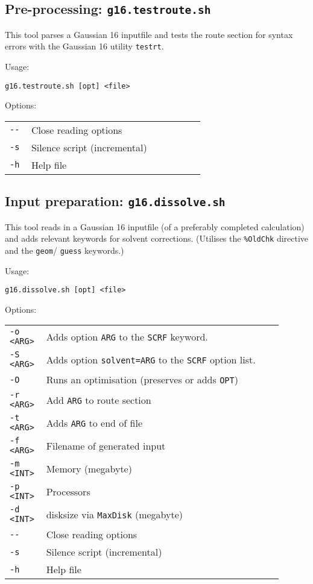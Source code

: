 \documentclass[   %
  final,          %
  a4paper         %
]{article}
\begin{document}
\subsection{Pre-processing: \texorpdfstring{{\lstinline`g16.testroute.sh`}}{g16.testroute.sh}}

This tool parses a Gaussian 16 inputfile and 
tests the route section for syntax errors 
with the Gaussian 16 utility \texttt{testrt}.

Usage: 

\lstinline`g16.testroute.sh [opt] <file>`

Options:

\begin{tabular}{p{0.1\linewidth}p{0.8\linewidth}}
  {\lstinline`--`} & Close reading options \\
  {\lstinline`-s`} & Silence script (incremental) \\
  {\lstinline`-h`} & Help file  \\
\end{tabular}

\subsection{Input preparation: \texorpdfstring{{\lstinline`g16.dissolve.sh`}}{g16.dissolve.sh}}

This tool reads in a Gaussian 16 inputfile (of a preferably completed calculation)
and adds relevant keywords for solvent corrections.
(Utilises the \texttt{\%OldChk} directive and the \texttt{geom}/ \texttt{guess} keywords.)

Usage: 

\lstinline`g16.dissolve.sh [opt] <file>`

Options:

\begin{tabular}{p{0.1\linewidth}p{0.8\linewidth}}
  {\lstinline`-o <ARG>`} & Adds option {\lstinline`ARG`} to the \texttt{SCRF} keyword. \\
  {\lstinline`-S <ARG>`} & Adds option \texttt{solvent={\lstinline`ARG`}} to the \texttt{SCRF} option list. \\
  {\lstinline`-O`}       & Runs an optimisation (preserves or adds \texttt{OPT}) \\
  {\lstinline`-r <ARG>`} & Add {\lstinline`ARG`} to route section \\
  {\lstinline`-t <ARG>`} & Adds {\lstinline`ARG`} to end of file \\
  {\lstinline`-f <ARG>`} & Filename of generated input \\
  {\lstinline`-m <INT>`} & Memory (megabyte) \\
  {\lstinline`-p <INT>`} & Processors \\
  {\lstinline`-d <INT>`} & disksize via \texttt{MaxDisk} (megabyte) \\
  {\lstinline`--`}       & Close reading options \\
  {\lstinline`-s`}       & Silence script (incremental) \\
  {\lstinline`-h`}       & Help file  \\
\end{tabular}
\end{document}
